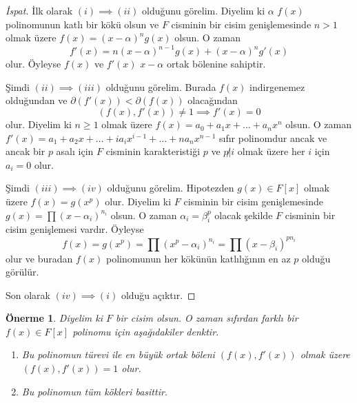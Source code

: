 \documentclass[draft]{article}
\newtheorem{prop}[thm]{Önerme}
\theoremstyle{definition}
\theoremstyle{remark}
\begin{document}
    	    \begin{proof}[İspat]
    	        İlk olarak $(i) \implies (ii)$ olduğunu görelim. Diyelim ki $\alpha$ $f(x)$ polinomunun katlı bir kökü olsun ve $F$ cisminin bir cisim genişlemesinde $n > 1$ olmak üzere $f(x) = (x - \alpha)^ng(x)$ olsun. O zaman
    	        \begin{equation*}
    	            f'(x) = n(x - \alpha)^{n - 1}g(x) + (x - \alpha)^ng'(x)
    	        \end{equation*}
    	        olur. Öyleyse $f(x)$ ve $f'(x)$ $x - \alpha$ ortak bölenine sahiptir.\par
    	        Şimdi $(ii) \implies (iii)$ olduğunu görelim. Burada $f(x)$ indirgenemez olduğundan ve $\partial(f'(x)) < \partial(f(x))$ olacağından
    	        \begin{equation*}
    	            (f(x), f'(x)) \neq 1 \implies f'(x) = 0
    	        \end{equation*}
    	        olur. Diyelim ki $n \geq 1$ olmak üzere $f(x) = a_0 + a_1x + \dots + a_nx^n$ olsun. O zaman $f'(x) = a_1 + a_2x + \dots + ia_ix^{i - 1} + \dots + na_nx^{n - 1}$ sıfır polinomdur ancak ve ancak bir $p$ asalı için $F$ cisminin karakteristiği $p$ ve $p \not| i$ olmak üzere her $i$ için $a_i = 0$ olur.\par
    	        Şimdi $(iii) \implies (iv)$ olduğunu görelim. Hipotezden $g(x) \in F[x]$ olmak üzere $f(x) = g(x^p)$ olur. Diyelim ki $F$ cisminin bir cisim genişlemesinde $g(x) = \prod{(x - \alpha_i)^{n_i}}$ olsun. O zaman $\alpha_i = \beta_i^p$ olacak şekilde $F$ cisminin bir cisim genişlemesi vardır. Öyleyse
    	        \begin{equation*}
    	            f(x) = g(x^p) = \prod{(x^p - \alpha_i)^{n_i}} = \prod{(x - \beta_i)^{pn_i}}
    	        \end{equation*}
    	        olur ve buradan $f(x)$ polinomunun her kökünün katlılığının en az $p$ olduğu görülür.\par
    	        Son olarak $(iv) \implies (i)$ olduğu açıktır.
    	    \end{proof}
    	    
    	    \begin{prop}
    	        Diyelim ki $F$ bir cisim olsun. O zaman sıfırdan farklı bir $f(x) \in F[x]$ polinomu için aşağıdakiler denktir.
    	        \begin{enumerate}
				\renewcommand{\labelenumi}{(\roman{enumi})}
				    \item Bu polinomun türevi ile en büyük ortak böleni $(f(x), f'(x))$ olmak üzere $(f(x), f'(x)) = 1$ olur.
				    \item Bu polinomun tüm kökleri basittir.
				\end{enumerate}
    	    \end{prop}
    	    
\end{document}
